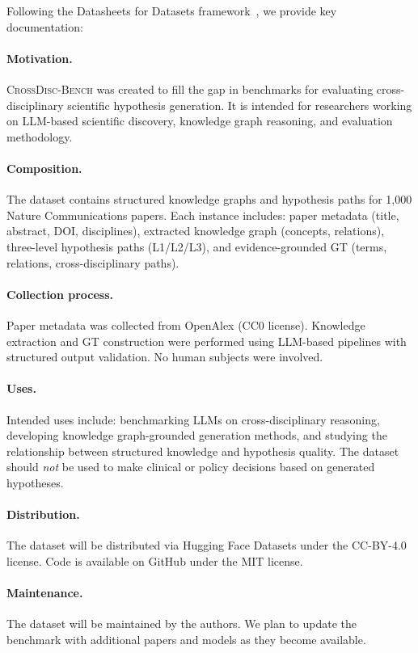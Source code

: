 \documentclass{article}
\newcommand{\ours}{\textsc{CrossDisc-Bench}}
\begin{document}
Following the Datasheets for Datasets framework~\cite{gebru2021datasheets}, we provide key documentation:

\paragraph{Motivation.}
\ours{} was created to fill the gap in benchmarks for evaluating cross-disciplinary scientific hypothesis generation. It is intended for researchers working on LLM-based scientific discovery, knowledge graph reasoning, and evaluation methodology.

\paragraph{Composition.}
The dataset contains structured knowledge graphs and hypothesis paths for 1{,}000 Nature Communications papers. Each instance includes: paper metadata (title, abstract, DOI, disciplines), extracted knowledge graph (concepts, relations), three-level hypothesis paths (L1/L2/L3), and evidence-grounded GT (terms, relations, cross-disciplinary paths).

\paragraph{Collection process.}
Paper metadata was collected from OpenAlex (CC0 license). Knowledge extraction and GT construction were performed using LLM-based pipelines with structured output validation. No human subjects were involved.

\paragraph{Uses.}
Intended uses include: benchmarking LLMs on cross-disciplinary reasoning, developing knowledge graph-grounded generation methods, and studying the relationship between structured knowledge and hypothesis quality. The dataset should \emph{not} be used to make clinical or policy decisions based on generated hypotheses.

\paragraph{Distribution.}
The dataset will be distributed via Hugging Face Datasets under the CC-BY-4.0 license. Code is available on GitHub under the MIT license.

\paragraph{Maintenance.}
The dataset will be maintained by the authors. We plan to update the benchmark with additional papers and models as they become available.
\end{document}
